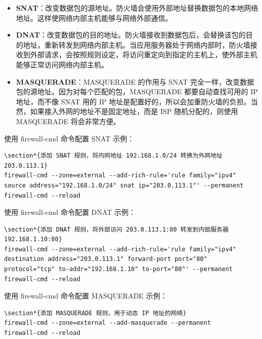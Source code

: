\documentclass[12pt,UTF8]{ctexbook}
\begin{document}
\begin{itemize}
    \item \textbf{SNAT}：改变数据包的源地址。防火墙会使用外部地址替换数据包的本地网络地址。这样使网络内部主机能够与网络外部通信。
    \item \textbf{DNAT}：改变数据包的目的地址。防火墙接收到数据包后，会替换该包的目的地址，重新转发到网络内部主机。当应用服务器处于网络内部时，防火墙接收到外部请求，会按照规则设定，将访问重定向到指定的主机上，使外部主机能够正常访问网络内部主机。
    \item \textbf{MASQUERADE}：MASQUERADE 的作用与 SNAT 完全一样，改变数据包的源地址。因为对每个匹配的包，MASQUERADE 都要自动查找可用的 IP 地址，而不像 SNAT 用的 IP 地址是配置好的，所以会加重防火墙的负担。当然，如果接入外网的地址不是固定地址，而是 ISP 随机分配的，则使用 MASQUERADE 将会非常方便。
\end{itemize}

使用 firewall-cmd 命令配置 SNAT 示例：
\begin{verbatim}
\section*{添加 SNAT 规则，将内网地址 192.168.1.0/24 转换为外网地址 203.0.113.1}
firewall-cmd --zone=external --add-rich-rule='rule family="ipv4" source address="192.168.1.0/24" snat ip="203.0.113.1"' --permanent
firewall-cmd --reload
\end{verbatim}

使用 firewall-cmd 命令配置 DNAT 示例：
\begin{verbatim}
\section*{添加 DNAT 规则，将外部访问 203.0.113.1:80 转发到内部服务器 192.168.1.10:80}
firewall-cmd --zone=external --add-rich-rule='rule family="ipv4" destination address="203.0.113.1" forward-port port="80" protocol="tcp" to-addr="192.168.1.10" to-port="80"' --permanent
firewall-cmd --reload
\end{verbatim}

使用 firewall-cmd 命令配置 MASQUERADE 示例：
\begin{verbatim}
\section*{添加 MASQUERADE 规则，用于动态 IP 地址的网络}
firewall-cmd --zone=external --add-masquerade --permanent
firewall-cmd --reload
\end{verbatim}
\end{document}
